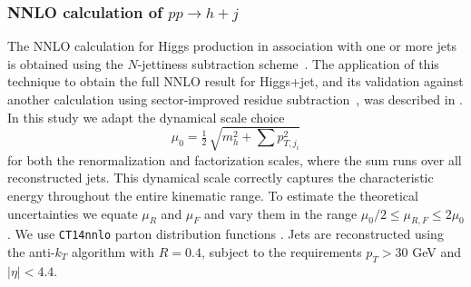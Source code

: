 \subsubsection{NNLO calculation of $pp\to h+j$}
\label{sec:hjetscomp:tools:fo:BFGLP}

The NNLO calculation for Higgs production in association with one or 
more jets is obtained using the $N$-jettiness subtraction 
scheme~\cite{Boughezal:2015dva,Gaunt:2015pea}.  The application of 
this technique to obtain the full NNLO result for Higgs+jet, and its 
validation against another calculation using sector-improved residue 
subtraction~\cite{Boughezal:2015dra}, was described in 
\cite{Boughezal:2015aha}.  In this study we adapt the dynamical scale choice
%
\begin{equation}
\mu_0 = \tfrac{1}{2}\,\sqrt{m_{h}^2+\sum p_{T,j_i}^2}
\end{equation}
%
for both the renormalization and factorization scales, where the sum 
runs over all reconstructed jets.  This dynamical scale correctly 
captures the characteristic energy throughout the entire kinematic 
range.  To estimate the theoretical uncertainties we equate $\mu_R$ 
and $\mu_F$ and vary them in the range $\mu_0/2 \leq \mu_{R,F} \leq 2 \mu_0$.  
We use \texttt{CT14nnlo} parton distribution functions 
\cite{Dulat:2015mca}.  Jets are reconstructed using the anti-$k_T$ algorithm 
with $R=0.4$, subject to the requirements $p_T>30$ GeV and $|\eta|<4.4$.
